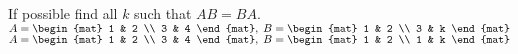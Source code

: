 
\begin{Exercise}[
name={},
title={}, 
difficulty=0,
origin={\cite{KK}}]
If possible find all $k$ such that $AB=BA$.
\Question $A=\begin{mat}
1 & 2 \\
3 & 4
\end{mat},\; B=\begin{mat}
1 & 2 \\
3 & k
\end{mat}
$
\Question $A=\begin{mat}
1 & 2 \\
3 & 4
\end{mat},\; B=\begin{mat}
1 & 2 \\
1 & k
\end{mat}
$
\end{Exercise}

